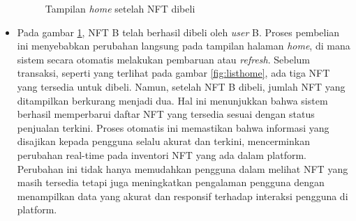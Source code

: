 \begin{itemize}
    \begin{figure} [H] \centering
    \caption{Tampilan \emph{home} setelah NFT dibeli}
    \label{fig:home_setelah_dibeli}
    \end{figure}
    
    \item Pada gambar \ref{fig:home_setelah_dibeli}, NFT B telah berhasil dibeli oleh \emph{user} B. Proses pembelian ini menyebabkan perubahan langsung pada tampilan halaman \emph{home}, di mana sistem secara otomatis melakukan pembaruan atau \emph{refresh}. Sebelum transaksi, seperti yang terlihat pada gambar \ref{fig:listhome}, ada tiga NFT yang tersedia untuk dibeli. Namun, setelah NFT B dibeli, jumlah NFT yang ditampilkan berkurang menjadi dua. Hal ini menunjukkan bahwa sistem berhasil memperbarui daftar NFT yang tersedia sesuai dengan status penjualan terkini. Proses otomatis ini memastikan bahwa informasi yang disajikan kepada pengguna selalu akurat dan terkini, mencerminkan perubahan real-time pada inventori NFT yang ada dalam platform. Perubahan ini tidak hanya memudahkan pengguna dalam melihat NFT yang masih tersedia tetapi juga meningkatkan pengalaman pengguna dengan menampilkan data yang akurat dan responsif terhadap interaksi pengguna di platform.
    

\end{itemize}
